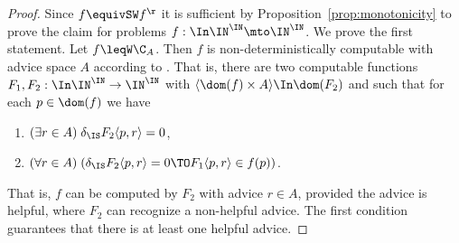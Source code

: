 \begin{proof}
Since $f\equivSW f^\r$ it is sufficient by Proposition~\ref{prop:monotonicity} to prove the claim for problems $f:\In\IN^\IN\mto\IN^\IN$. We prove the first statement.
Let $f\leqW\C_A$. Then $f$ is non-deterministically computable with advice space $A$
according to \cite[Definition~7.1, Theorem~7.2]{BBP12}.  That is, there are two computable functions $F_1,F_2:\In\IN^\IN\to\IN^\IN$
with $\langle\dom(f)\times A\rangle\In\dom(F_2)$ and such that for each $p\in\dom(f)$ we have
\begin{enumerate}
\item $(\exists r\in A)\;\delta_\IS F_2\langle p,r\rangle=0$,
\item $(\forall r\in A)\;(\delta_\IS F_2\langle p,r\rangle=0\TO F_1\langle p,r\rangle\in f(p))$.
\end{enumerate}
That is, $f$ can be computed by $F_2$ with advice $r\in A$, provided the advice is helpful, where
$F_2$ can recognize a non-helpful advice.
The first condition guarantees that there is at least one helpful advice.


\end{proof}
